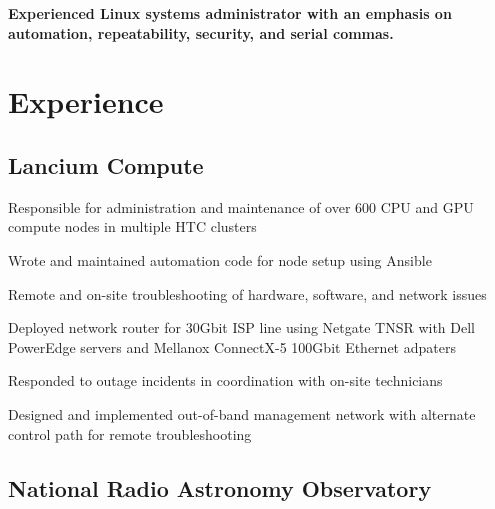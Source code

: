 \documentclass[letterpaper]{deedy-resume-openfont}
\begin{document}
\begin{minipage}[t]{0.69\textwidth} %
\vspace{3pt}
\newcommand{\summary}[1]{ %
\raggedright\bfseries { #1 \\}
\hrulefill
}

\summary{Experienced Linux systems administrator with an emphasis on automation, repeatability, security, and serial commas.} 

\section{Experience}

\subsection{Lancium Compute}

\begin{tightemize}
	\item Responsible for administration and maintenance of over 600 CPU and GPU compute nodes in multiple HTC clusters
	\item Wrote and maintained automation code for node setup using Ansible
	\item Remote and on-site troubleshooting of hardware, software, and network issues
	\item Deployed network router for 30Gbit ISP line using Netgate TNSR with Dell PowerEdge servers and Mellanox ConnectX-5 100Gbit Ethernet adpaters
	\item Responded to outage incidents in coordination with on-site technicians
	\item Designed and implemented out-of-band management network with alternate control path for remote troubleshooting
\end{tightemize}
\vspace{6pt}

\subsection{National Radio Astronomy Observatory}


\end{minipage}
\end{document}
